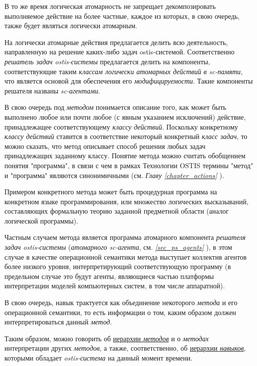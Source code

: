 В то же время логическая атомарность не запрещает декомпозировать выполняемое действие на более частные, каждое из которых, в свою очередь, также будет являться логически атомарным.
	
На логически атомарные действия предлагается делить всю деятельность, направленную на решение каких-либо задач ostis-системой. Соответственно \textit{решатель задач ostis-системы} предлагается делить на компоненты, соответствующие таким \textit{классам логически атомарных действий в sc-памяти}, что является основой для обеспечения его \textit{модифицируемости}. Такие компоненты решателя названы \textit{sc-агентами}.

В свою очередь под \textit{методом} понимается описание того, как может быть выполнено любое или почти любое (с явным указанием исключений) действие, принадлежащее соответствующему \textit{классу действий}. Поскольку конкретному \textit{классу действий} ставится в соответствие некоторый конкретный \textit{класс задач}, то можно сказать, что метод описывает способ решения любых задач принадлежащих заданному классу. Понятие метода можно считать обобщением понятия "программа"{}, в связи с чем в рамках Технологии OSTIS термины "метод"{} и "программа"{} являются синонимичными (см. \textit{Главу \ref{chapter_actions} }).

Примером конкретного метода может быть процедурная программа на конкретном языке программирования, или множество логических высказываний, составляющих формальную теорию заданной предметной области (аналог логической программы). 

Частным случаем метода является программа атомарного компонента \textit{решателя задач ostis-системы} (\textit{атомарного sc-агента}, см. \textit{\ref{sec_ps_agents} }), в этом случае в качестве операционной семантики метода выступает коллектив агентов более низкого уровня, интерпретирующий соответствующую программу (в  предельном случае это будут агенты, являющиеся частью платформы интерпретации моделей компьютерных систем, в том числе аппаратной).

В свою очередь, навык трактуется как объединение некоторого \textit{метода} и его операционной семантики, то есть информации о том, каким образом должен интерпретироваться данный \textit{метод}.

Таким образом, можно говорить об \underline{иерархии \textit{методов}} и о \textit{методах} интерпретации других \textit{методов}, а также, соответственно, об \underline{иерархии \textit{навыков}}, которыми обладает \textit{ostis-система} на данный момент времени.


